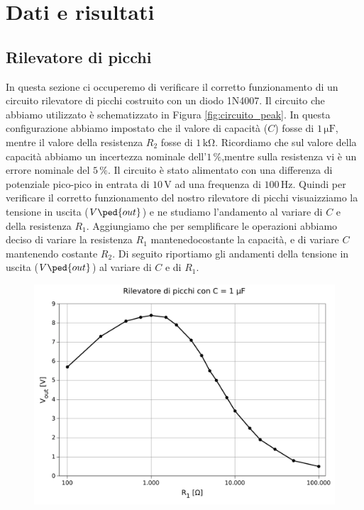 \section*{Dati e risultati}

\subsection{Rilevatore di picchi}

In questa sezione ci occuperemo di verificare il corretto funzionamento di un circuito rilevatore di picchi costruito con un diodo 1N4007. Il circuito che abbiamo utilizzato è schematizzato in Figura \ref{fig:circuito_peak}.
In questa configurazione abbiamo impostato che il valore di capacità ($C$) fosse di $1\,\si{\micro\farad}$, mentre il valore della resistenza $R_2$ fosse di $1\,\si{\kilo\ohm}$. Ricordiamo che sul valore della capacità abbiamo un incertezza nominale dell'$1\,\%$,mentre sulla resistenza vi è un errore nominale del $5\,\%$.
Il circuito è stato alimentato con una differenza di potenziale pico-pico in entrata di $10\,\si{\volt}$ ad una frequenza di $100\,\si{\hertz}$.
Quindi per verificare il corretto funzionamento del nostro rilevatore di picchi visuaizziamo la tensione in uscita ($V\ped{out}$) e ne studiamo l'andamento al variare di $C$ e della resistenza $R_1$.
Aggiungiamo che per semplificare le operazioni abbiamo deciso di variare la resistenza $R_1$ mantenedocostante la capacità, e di variare $C$ mantenendo costante $R_2$.
Di seguito riportiamo gli andamenti della tensione in uscita ($V\ped{out}$) al variare di $C$ e di $R_1$.

\begin{figure}
    \includegraphics[scale=0.7]{capacita.pdf}
    \caption{}
    \label{fig:capacita}
\end{figure}

